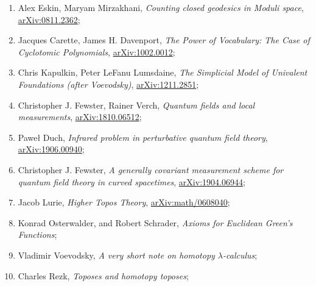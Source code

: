 \documentclass[a4paper,11pt]{article}
\begin{document}
\begin{enumerate}
\item Alex Eskin, Maryam Mirzakhani, \textit{Counting closed geodesics
    in Moduli space},
  \href{https://arxiv.org/abs/0811.2362v3}{arXiv:0811.2362};



\item Jacques Carette, James H. Davenport, \textit{The Power of
    Vocabulary: The Case of Cyclotomic Polynomials},
  \href{https://arxiv.org/abs/1002.0012v1}{arXiv:1002.0012};



\item Chris Kapulkin, Peter LeFanu Lumsdaine, \textit{The Simplicial
    Model of Univalent Foundations (after Voevodsky)},
  \href{https://arxiv.org/abs/1211.2851v5}{arXiv:1211.2851};



\item Christopher J. Fewster, Rainer Verch, \textit{Quantum fields and
    local measurements},
  \href{https://arxiv.org/abs/1810.06512}{arXiv:1810.06512};



\item Paweł Duch, \textit{Infrared problem in perturbative quantum
    field theory},
  \href{https://arxiv.org/abs/1906.00940}{arXiv:1906.00940};



\item Christopher J. Fewster, \textit{A generally covariant
    measurement scheme for quantum field theory in curved spacetimes},
  \href{https://arxiv.org/abs/1904.06944v1}{arXiv:1904.06944};



\item Jacob Lurie, \textit{Higher Topos Theory},
  \href{https://arxiv.org/abs/math/0608040v4}{arXiv:math/0608040};



\item Konrad Osterwalder, and Robert Schrader, \textit{Axioms for
    Euclidean Green's Functions};



\item Vladimir Voevodsky, \textit{A very short note on homotopy
    $\lambda$-calculus};



\item Charles Rezk, \textit{Toposes and homotopy toposes};




\end{enumerate}
\end{document}
